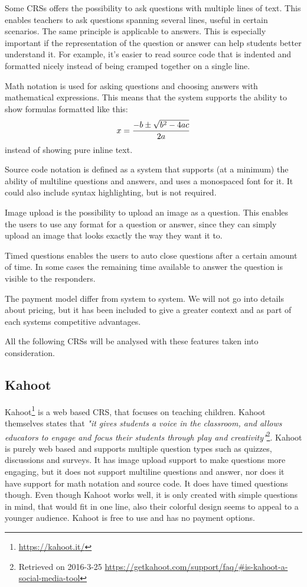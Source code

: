 Some CRSs offers the possibility to ask questions with multiple lines of text. This enables teachers to ask questions spanning several lines, useful in certain scenarios. The same principle is applicable to answers. This is especially important if the representation of the question or answer can help students better understand it. For example, it's easier to read source code that is indented and formatted nicely instead of being cramped together on a single line.

Math notation is used for asking questions and choosing answers with mathematical expressions. This means that the system supports the ability to show formulas formatted like this: $$x = {-b \pm \sqrt{b^2-4ac} \over 2a}$$ instead of showing pure inline text. 

Source code notation is defined as a system that supports (at a minimum) the ability of multiline questions and answers, and uses a monospaced font for it. It could also include syntax highlighting, but is not required. 

Image upload is the possibility to upload an image as a question. This enables the users to use any format for a question or answer, since they can simply upload an image that looks exactly the way they want it to.

Timed questions enables the users to auto close questions after a certain amount of time. In some cases the remaining time available to answer the question is visible to the responders.

The payment model differ from system to system. We will not go into details about pricing, but it has been included to give a greater context and as part of each systems competitive advantages.

All the following CRSs will be analysed with these features taken into consideration. %

\subsection*{Kahoot}
Kahoot\footnote{\url{https://kahoot.it/}} is a web based CRS, that focuses on teaching children. Kahoot themselves states that  \emph{"it gives students a voice in the classroom, and allows educators to engage and focus their students through play and creativity"}\footnote{Retrieved on 2016-3-25 \url{https://getkahoot.com/support/faq/\#is-kahoot-a-social-media-tool}}. Kahoot is purely web based and supports multiple question types such as quizzes, discussions and surveys. It has image upload support to make questions more engaging, but it does not support multiline questions and answer, nor does it have support for math notation and source code. It does have timed questions though. Even though Kahoot works well, it is only created with simple questions in mind, that would fit in one line, also their colorful design seems to appeal to a younger audience. Kahoot is free to use and has no payment options.

